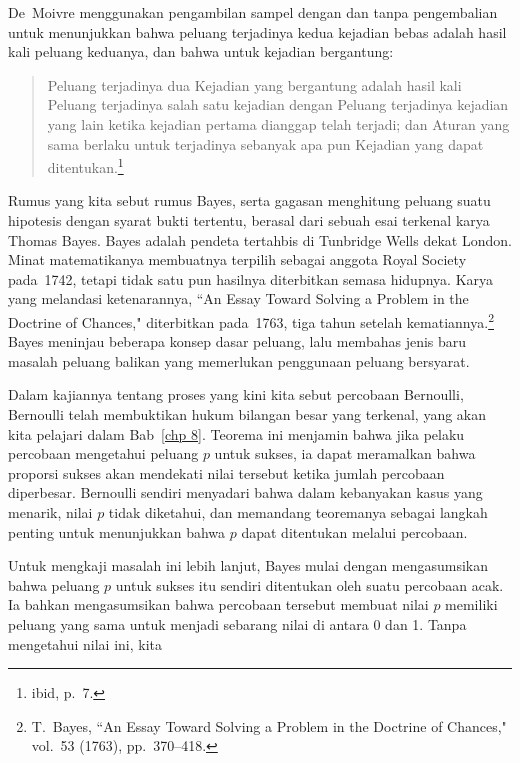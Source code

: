De~Moivre menggunakan pengambilan sampel dengan dan tanpa pengembalian untuk menunjukkan bahwa
peluang terjadinya kedua kejadian bebas adalah hasil kali peluang
keduanya, dan bahwa untuk kejadian bergantung:
\begin{quote}
Peluang terjadinya dua Kejadian yang bergantung adalah hasil kali
Peluang terjadinya salah satu kejadian dengan Peluang terjadinya kejadian yang lain
ketika kejadian pertama dianggap telah terjadi; dan
Aturan yang sama berlaku untuk terjadinya sebanyak apa pun Kejadian yang dapat
ditentukan.\footnote{ibid, p.~7.}
\end{quote}
\par
Rumus yang kita sebut rumus Bayes, serta gagasan menghitung
peluang suatu hipotesis dengan syarat bukti tertentu, berasal dari sebuah esai terkenal karya
Thomas Bayes.  Bayes adalah pendeta tertahbis di Tunbridge Wells dekat London. 
Minat matematikanya membuatnya terpilih sebagai anggota Royal Society pada~1742,
tetapi tidak satu pun hasilnya diterbitkan semasa hidupnya.  Karya yang
melandasi ketenarannya, ``An Essay Toward Solving a Problem in the Doctrine of
Chances," diterbitkan pada~1763, tiga tahun setelah
kematiannya.\footnote{T.~Bayes, ``An Essay Toward Solving a Problem in the Doctrine
of Chances,"  vol.~53 (1763),
pp.~370--418.}  Bayes meninjau beberapa konsep dasar peluang, lalu
membahas jenis baru masalah peluang balikan yang memerlukan penggunaan
peluang bersyarat.
\par
Dalam kajiannya tentang proses yang kini kita sebut percobaan Bernoulli, Bernoulli telah
membuktikan hukum bilangan besar yang terkenal, yang akan kita pelajari dalam Bab~\ref{chp
8}.  Teorema ini menjamin bahwa jika pelaku percobaan mengetahui peluang $p$
untuk sukses, ia dapat meramalkan bahwa proporsi sukses akan mendekati
nilai tersebut ketika jumlah percobaan diperbesar.  Bernoulli sendiri
menyadari bahwa dalam kebanyakan kasus yang menarik, nilai $p$ tidak diketahui, dan
memandang teoremanya sebagai langkah penting untuk menunjukkan bahwa $p$ dapat ditentukan melalui
percobaan.
\par
Untuk mengkaji masalah ini lebih lanjut, Bayes mulai dengan mengasumsikan bahwa peluang
$p$ untuk sukses itu sendiri ditentukan oleh suatu percobaan acak.  Ia bahkan
mengasumsikan bahwa percobaan tersebut membuat nilai $p$ memiliki peluang yang sama untuk
menjadi sebarang nilai di antara 0 dan 1.  Tanpa mengetahui nilai ini, kita
